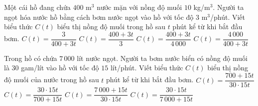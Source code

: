 

\begin{ex}%
	Một cái hồ đang chứa $400$ m$^3$ nước mặn với nồng độ muối $10$ kg/m$^3$. Người ta ngọt hóa  nước hồ bằng cách bơm nước ngọt vào hồ với tốc độ $3$ m$^3$/phút. Viết biểu thức $C(t)$ biểu thị nồng độ muối trong hồ sau $t$ phút kể từ khi bắt đầu bơm.
	 \choice
		 {$C(t)=\dfrac3{400+3t}$}
		{$C(t)=\dfrac{400+3t}3$} 
		{$C(t)=\dfrac{400+3t}{4\,000}$} 
		{\True  $C(t)=\dfrac{4\,000}{400+3t}$}
\end{ex}

\begin{ex}%
	Trong hồ có chứa $7\,000$ lít nước ngọt. Người ta bơm nước biển có nồng độ muối là $30$ gam/lít vào hồ với tốc độ $15$ lít/phút. Viết biểu thức $C(t)$ biểu thị nồng độ  muối của nước trong hồ sau $t$ phút kể từ khi bắt đầu bơm.
	\choice 
		{$C(t)=\dfrac{700+15t}{30\cdot15t}$} 
		{$C(t)=\dfrac{30\cdot15t}{700+15t}$} 
		 {$C(t)=\dfrac{7\,000+15t}{30\cdot15t}$}
		{\True  $C(t)=\dfrac{30\cdot15t}{7\,000+15t}$}
\end{ex}

